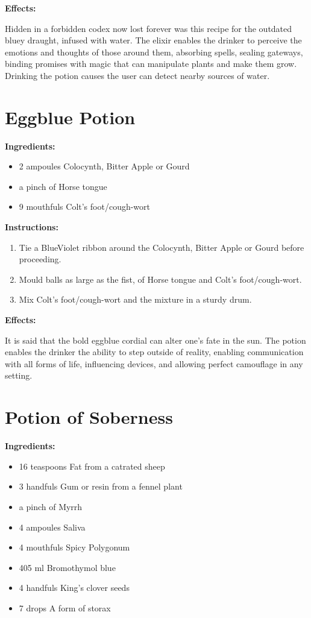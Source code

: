 \documentclass{article}
\begin{document}
\textbf{Effects:}

Hidden in a forbidden codex now lost forever was this recipe for the outdated bluey draught, infused with water. The elixir enables the drinker to perceive the emotions and thoughts of those around them, absorbing spells, sealing gateways, binding promises with magic that can manipulate plants and make them grow. Drinking the potion causes the user can detect nearby sources of water.

\newpage
\section*{Eggblue Potion}

\textbf{Ingredients:}

\begin{itemize}
  \item 2 ampoules Colocynth, Bitter Apple or Gourd
  \item a pinch of Horse tongue
  \item 9 mouthfuls Colt's foot/cough-wort
\end{itemize}

\textbf{Instructions:}

\begin{enumerate}
  \item Tie a BlueViolet ribbon around the Colocynth, Bitter Apple or Gourd before proceeding.
  \item Mould balls as large as the fist, of Horse tongue and Colt's foot/cough-wort.
  \item Mix Colt's foot/cough-wort and the mixture in a sturdy drum.
\end{enumerate}

\textbf{Effects:}

It is said that the bold eggblue cordial can alter one's fate in the sun. The potion enables the drinker the ability to step outside of reality, enabling communication with all forms of life, influencing devices, and allowing perfect camouflage in any setting.

\newpage
\section*{Potion of Soberness}

\textbf{Ingredients:}

\begin{itemize}
  \item 16 teaspoons Fat from a catrated sheep
  \item 3 handfuls Gum or resin from a fennel plant
  \item a pinch of Myrrh
  \item 4 ampoules Saliva
  \item 4 mouthfuls Spicy Polygonum
  \item 405 ml Bromothymol blue
  \item 4 handfuls King's clover seeds
  \item 7 drops A form of storax
\end{itemize}
\end{document}
